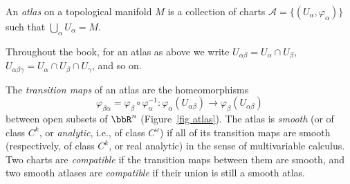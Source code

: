 \begin{defn}[Atlas]
    An \emph{atlas} on a topological manifold $M$ is a collection of charts $\mathcal{A}=\{(U_\alpha,\varphi_\alpha)\}$ such that $\bigcup_\alpha U_\alpha=M$.
\end{defn}
Throughout the book, for an atlas as above we write $U_{\alpha\beta}=U_\alpha\cap U_\beta$, $U_{\alpha\beta\gamma}=U_\alpha\cap U_\beta\cap U_\gamma$, and so on.

\begin{defn}
    The \emph{transition maps} of an atlas are the homeomorphisms
    \[\varphi_{\beta\alpha}=\varphi_\beta\circ\varphi_\alpha^{-1}:\varphi_\alpha(U_{\alpha\beta})\to\varphi_\beta(U_{\alpha\beta})\]
    between open subsets of $\bbR^n$ (Figure~\ref{fig atlas}). The atlas is \emph{smooth} (or of class $C^k$, or \emph{analytic}, i.e., of class $C^\omega$) if all of its transition maps are smooth (respectively, of class $C^k$, or real analytic) in the sense of multivariable calculus. Two charts are \emph{compatible} if the transition maps between them are smooth, and two smooth atlases are \emph{compatible} if their union is still a smooth atlas.
\end{defn}

